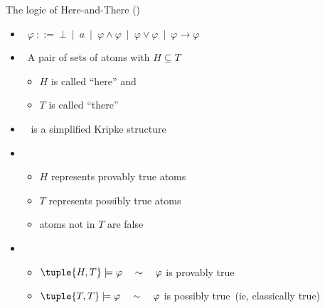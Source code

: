 \begin{frame}{The logic of Here-and-There (\HT)}
  \smallskip
  \begin{itemize}
  \item<2->  \
    \(
    \varphi \ ::= \ \bot \ \mid \ a \ \mid \ \varphi \land \varphi \ \mid \  \varphi \lor \varphi \ \mid \  \varphi \rightarrow \varphi
    \)
    \medskip
  \item<3->  \ A pair  of sets of atoms with $H \subseteq T$
    \begin{itemize}
    \item $H$ is called ``here'' and
    \item $T$ is called ``there''
    \end{itemize}
  \item<4->  \  is a simplified Kripke structure
    \medskip
  \item<5->  \
    \begin{itemize}
    \item $H$ represents provably true atoms
    \item $T$ represents possibly true atoms
    \item \phantom{$T$} atoms not in $T$ are false
    \end{itemize}
    \smallskip
  \item<6-> 
    \begin{itemize}
    \item $\tuple{H,T}\models\varphi\quad \sim\quad \varphi$ is provably true
    \item $\tuple{T,T}\models\varphi\quad \sim\quad \varphi$ is possibly true\pause[6] \ (ie, classically true)
    \end{itemize}
  \end{itemize}
\end{frame}
